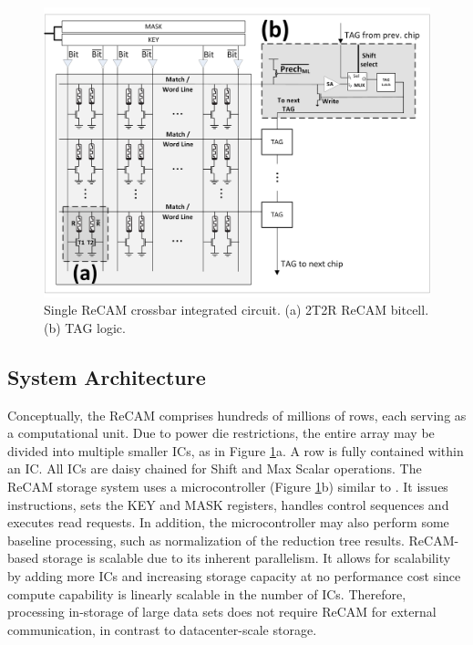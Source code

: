 \documentclass{superfri}
\begin{document}
\begin{figure}[h!]
	\centerline{\includegraphics[scale=0.4]{Figures/ReCAM_array.jpg}}
	\caption{Single ReCAM crossbar integrated circuit. (a) 2T2R ReCAM bitcell. (b) TAG logic.}
	\label{fig:ReCAM_IC}
\end{figure}




\subsection{System Architecture}
\label{sec:system_architecture}
Conceptually, the ReCAM comprises hundreds of millions of rows, each serving as a computational unit. Due to power die restrictions, the entire array may be divided into multiple smaller ICs, as in Figure \ref{fig:ReCAM_IC}a. A row is fully contained within an IC. All ICs are daisy chained for Shift and Max Scalar operations.
The ReCAM storage system uses a microcontroller (Figure \ref{fig:ReCAM_IC}b) similar to \cite{guo2013ac}. It issues instructions, sets the KEY and MASK registers, handles control sequences and executes read requests. In addition, the microcontroller may also perform some baseline processing, such as normalization of the reduction tree results.
ReCAM-based storage is scalable due to its inherent parallelism. It allows for scalability by adding more ICs and increasing storage capacity at no performance cost since compute capability is linearly scalable in the number of ICs. Therefore, processing in-storage of large data sets does not require ReCAM for external communication, in contrast to datacenter-scale storage. 
\end{document}
